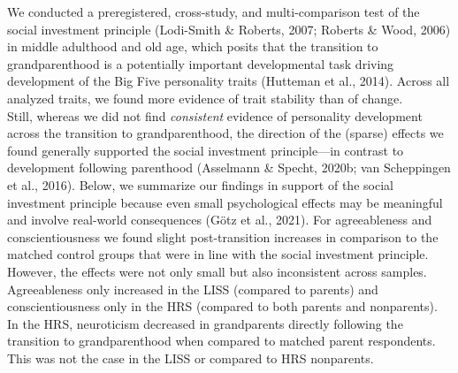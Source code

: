 \documentclass[
  english,
  man,floatsintext]{apa7}
\begin{document}
We conducted a preregistered, cross-study, and multi-comparison test of the social investment principle (Lodi-Smith \& Roberts, 2007; Roberts \& Wood, 2006) in middle adulthood and old age, which posits that the transition to grandparenthood is a potentially important developmental task driving development of the Big Five personality traits (Hutteman et al., 2014). Across all analyzed traits, we found more evidence of trait stability than of change.\\
Still, whereas we did not find \emph{consistent} evidence of personality development across the transition to grandparenthood, the direction of the (sparse) effects we found generally supported the social investment principle---in contrast to development following parenthood (Asselmann \& Specht, 2020b; van Scheppingen et al., 2016). Below, we summarize our findings in support of the social investment principle because even small psychological effects may be meaningful and involve real-world consequences (Götz et al., 2021). For agreeableness and conscientiousness we found slight post-transition increases in comparison to the matched control groups that were in line with the social investment principle. However, the effects were not only small but also inconsistent across samples. Agreeableness only increased in the LISS (compared to parents) and conscientiousness only in the HRS (compared to both parents and nonparents). In the HRS, neuroticism decreased in grandparents directly following the transition to grandparenthood when compared to matched parent respondents. This was not the case in the LISS or compared to HRS nonparents.\\
\end{document}
